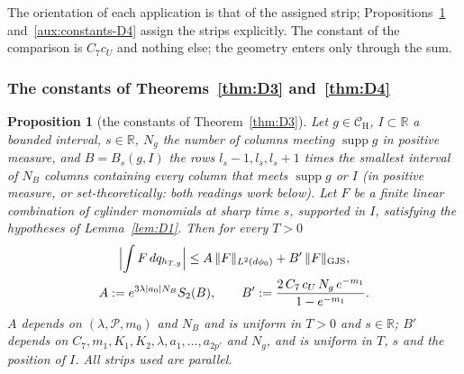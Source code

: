 \documentclass[11pt,a4paper]{article}
\theoremstyle{plain}
\theoremstyle{definition}
\theoremstyle{plain}
\newtheorem{auxprop}[auxlemma]{Proposition}
\theoremstyle{definition}
\newcommand{\R}{\mathbb{R}}
\newcommand{\CH}{\mathcal{C}_{\mathrm H}}
\DeclareMathOperator{\supp}{supp}
\newcommand{\GJS}[1]{\lVert #1\rVert_{\mathrm{GJS}}}   %
\newcommand{\dphi}{d\phi_0}
\begin{document}
The orientation of each application is that of the assigned strip;
Propositions~\ref{aux:constants-D3} and~\ref{aux:constants-D4} assign the strips explicitly.  The
constant of the comparison is $C_7c_U$ and nothing else; the geometry enters only through the
sum.

\subsubsection*{The constants of Theorems~\ref{thm:D3} and~\ref{thm:D4}}

\begin{auxprop}[the constants of Theorem~\ref{thm:D3}]\label{aux:constants-D3}
Let $g\in\CH$, $I\subset\R$ a bounded interval, $s\in\R$, $N_g$ the number of columns meeting
$\supp g$ in positive measure, and $B=B_s(g,I)$ the rows $l_s-1,l_s,l_s+1$ times the smallest
interval of $N_B$ columns containing every column that meets $\supp g$ or $I$ (in positive
measure, or set-theoretically: both readings work below).  Let $F$ be a finite linear
combination of cylinder monomials at sharp time $s$, supported in $I$, satisfying the
hypotheses of Lemma~\ref{lem:D1}.  Then for every $T>0$
\[
\begin{gathered}
 \Bigl|\int F\,dq_{h_{T,g}}\Bigr|\le A\,\|F\|_{L^2(\dphi)}+B'\,\GJS F,\\
 A:=e^{3\lambda|a_0|N_B}S_2(B),\qquad B':=\frac{2\,C_7\,c_U\,N_g\,e^{-m_1}}{1-e^{-m_1}} .
\end{gathered}
\]
$A$ depends on $(\lambda,\mathscr P,m_0)$ and $N_B$ and is uniform in $T>0$ and $s\in\R$;
$B'$ depends on $C_7,m_1,K_1,K_2,\lambda,a_1,\dots,a_{2p'}$ and $N_g$, and is uniform in $T$,
$s$ and the position of $I$.  All strips used are parallel.
\end{auxprop}
\end{document}
